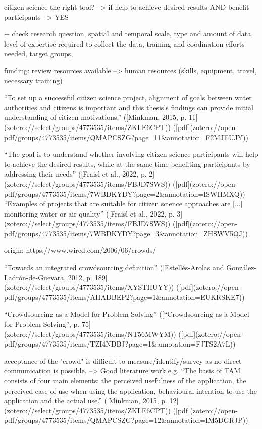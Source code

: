 {citizen science the right tool?
--> if help to achieve desired results AND benefit participants --> YES

+ check research question, spatial and temporal scale, type and amount of data, level of expertise required to collect the data, training and coodination efforts needed, target groups, 

funding: review resources available --> human resources (skills, equipment, travel, necessary training)

“To set up a successful citizen science project, alignment of goals between water authorities and citizens is important and this thesis’s findings can provide initial understanding of citizen motivations.” ([Minkman, 2015, p. 11](zotero://select/groups/4773535/items/ZKLE6CPT)) ([pdf](zotero://open-pdf/groups/4773535/items/QMAPCSZG?page=11&annotation=F2MJEUJY))


“The goal is to understand whether involving citizen science participants will help to achieve the desired results, while at the same time benefiting participants by addressing their needs” ([Fraisl et al., 2022, p. 2](zotero://select/groups/4773535/items/FBJD7SWS)) ([pdf](zotero://open-pdf/groups/4773535/items/7WBDKYDY?page=2&annotation=ISWIIMXQ))
“Examples of projects that are suitable for citizen science approaches are [...] monitoring water or air quality” ([Fraisl et al., 2022, p. 3](zotero://select/groups/4773535/items/FBJD7SWS)) ([pdf](zotero://open-pdf/groups/4773535/items/7WBDKYDY?page=3&annotation=ZHSWV5QJ))

origin: https://www.wired.com/2006/06/crowds/

“Towards an integrated crowdsourcing definition” ([Estellés-Arolas and González-Ladrón-de-Guevara, 2012, p. 189](zotero://select/groups/4773535/items/XYSTHUYY)) ([pdf](zotero://open-pdf/groups/4773535/items/AHADBEP2?page=1&annotation=EUKRSKE7))

“Crowdsourcing as a Model for Problem Solving” ([“Crowdsourcing as a Model for Problem Solving”, p. 75](zotero://select/groups/4773535/items/NT56MWYM)) ([pdf](zotero://open-pdf/groups/4773535/items/TZI4NDBJ?page=1&annotation=FJTS2A7L))


acceptance of the "crowd" is difficult to measure/identify/survey as no direct communication is possible. --> Good literature work e.g. “The basis of TAM consists of four main elements: the perceived usefulness of the application, the perceived ease of use when using the application, behavioural intention to use the application and the actual use.” ([Minkman, 2015, p. 12](zotero://select/groups/4773535/items/ZKLE6CPT)) ([pdf](zotero://open-pdf/groups/4773535/items/QMAPCSZG?page=12&annotation=IM5DGRJP))

}
